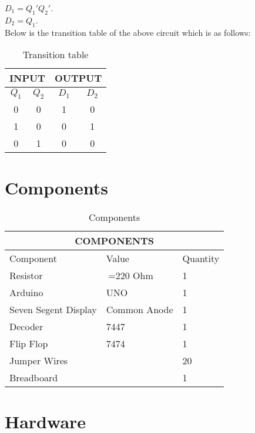 \documentclass{article}
\begin{document}
  $D_1 = Q_1'Q_2'$.\\
   $D_2 = Q_1$.\\

Below is the transition table of the above circuit which is as follows:
\pagebreak

 \begin{table}[h]
  \begin{center}
   \begin{tabular}[h]{|c|c|c|c|}
\hline \multicolumn{2}{|c|}{INPUT} & \multicolumn{2}{|c|}{OUTPUT} \\
\hline $Q_1$ & $Q_2$ & $D_1$ & $D_2$ \\
\hline 0 & 0 & 1 & 0 \\
\hline 1 & 0 & 0 & 1 \\
\hline 0 & 1 & 0 & 0 \\
\hline
\end{tabular}
   \caption{Transition table}
   \label{table:2}
  \end{center}
 \end{table}

\section{Components}
 
 \begin{table}[h]
  \begin{center}
   \begin{tabular}{|p{5cm}|p{3cm}|p{2cm}|}
\hline
\multicolumn{3}{|c|}{COMPONENTS}\\
\hline
Component& Value& Quantity\\
\hline
Resistor& $\>$=220 Ohm& 1\\
\hline
Arduino& UNO& 1\\
\hline
Seven Segent Display& Common Anode& 1\\
\hline
Decoder& 7447& 1\\
\hline
Flip Flop& 7474& 1\\
\hline
Jumper Wires&  & 20\\
\hline
Breadboard&  & 1\\
\hline
\end{tabular}
   \caption{Components}
   \label{table:1}
  \end{center}
 \end{table}


\section{Hardware}
\end{document}
